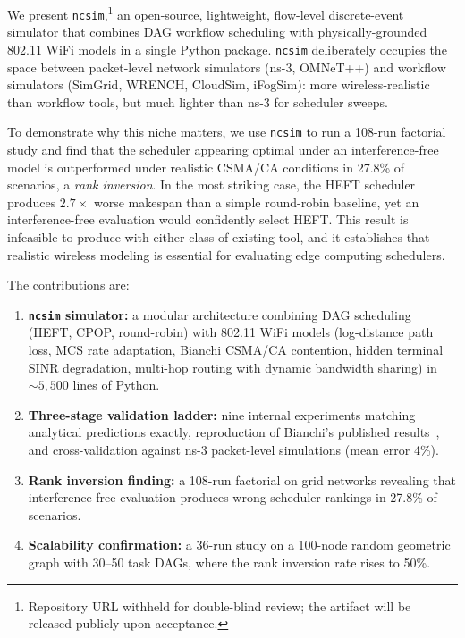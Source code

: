 \documentclass[conference]{IEEEtran}
\newcommand{\ncsim}{\texttt{ncsim}}
\begin{document}
We present \ncsim{},\footnote{Repository URL withheld for double-blind review; the artifact will be released publicly upon acceptance.}
an open-source, lightweight, flow-level discrete-event simulator that
combines DAG workflow scheduling with physically-grounded 802.11 WiFi
models in a single Python package.  \ncsim{} deliberately occupies the
space between packet-level network simulators (ns-3, OMNeT++) and
workflow simulators (SimGrid, WRENCH, CloudSim, iFogSim): more
wireless-realistic than workflow tools, but much lighter than ns-3 for
scheduler sweeps.

To demonstrate why this niche matters, we use \ncsim{} to run a 108-run
factorial study and find that the scheduler appearing optimal under an
interference-free model is outperformed under realistic CSMA/CA
conditions in 27.8\% of scenarios, a \emph{rank inversion}.  In the
most striking case, the HEFT scheduler produces $2.7\times$ worse
makespan than a simple round-robin baseline, yet an interference-free
evaluation would confidently select HEFT.  This result is infeasible
to produce with either class of existing tool, and it establishes
that realistic wireless modeling is essential for evaluating edge
computing schedulers.

The contributions are:

\begin{enumerate}[itemsep=2pt,leftmargin=*]
\item \textbf{\ncsim{} simulator:} a modular architecture combining DAG
  scheduling (HEFT, CPOP, round-robin) with 802.11 WiFi models
  (log-distance path loss, MCS rate adaptation, Bianchi CSMA/CA
  contention, hidden terminal SINR degradation, multi-hop routing with
  dynamic bandwidth sharing) in ${\sim}5{,}500$ lines of Python.
\item \textbf{Three-stage validation ladder:} nine internal experiments
  matching analytical predictions exactly, reproduction of Bianchi's
  published results~\cite{bianchi2000}, and cross-validation against
  ns-3 packet-level simulations (mean error 4\%).
\item \textbf{Rank inversion finding:} a 108-run factorial on grid networks
  revealing that interference-free evaluation produces wrong scheduler
  rankings in 27.8\% of scenarios.
\item \textbf{Scalability confirmation:} a 36-run study on a 100-node
  random geometric graph with 30--50 task DAGs, where the rank inversion
  rate rises to 50\%.
\end{enumerate}
\end{document}

